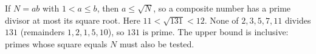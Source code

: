 If $N=ab$ with $1<a\le b$, then $a\le\sqrt N$, so a composite number has a prime divisor at most its square root. Here $11<\sqrt{131}<12$. None of $2,3,5,7,11$ divides $131$ (remainders $1,2,1,5,10$), so $\boxed{131\text{ is prime}}$. The upper bound is inclusive: primes whose square equals $N$ must also be tested.
